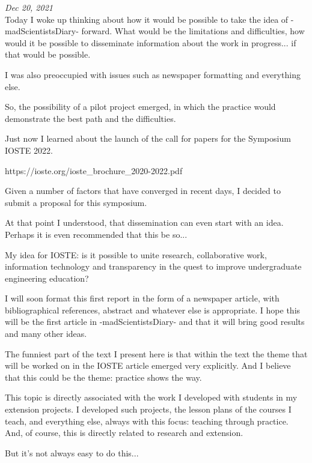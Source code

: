 \documentclass[11pt,letterpaper,twocolumn]{article}
\begin{document}
\emph{Dec 20, 2021} \\

Today I woke up thinking about how it would be possible to take the idea of -madScientistsDiary- forward. What would be the limitations and difficulties, how would it be possible to disseminate information about the work in progress... if that would be possible.

I was also preoccupied with issues such as newspaper formatting and everything else.

So, the possibility of a pilot project emerged, in which the practice would demonstrate the best path and the difficulties.

Just now I learned about the launch of the call for papers for the Symposium IOSTE 2022.

https://ioste.org/ioste\_brochure\_2020-2022.pdf

Given a number of factors that have converged in recent days, I decided to submit a proposal for this symposium.

At that point I understood, that dissemination can even start with an idea. Perhaps it is even recommended that this be so...

My idea for IOSTE: is it possible to unite research, collaborative work, information technology and transparency in the quest to improve undergraduate engineering education?

I will soon format this first report in the form of a newspaper article, with bibliographical references, abstract and whatever else is appropriate. I hope this will be the first article in -madScientistsDiary- and that it will bring good results and many other ideas.

The funniest part of the text I present here is that within the text the theme that will be worked on in the IOSTE article emerged very explicitly. And I believe that this could be the theme: practice shows the way.

This topic is directly associated with the work I developed with students in my extension projects. I developed such projects, the lesson plans of the courses I teach, and everything else, always with this focus: teaching through practice. And, of course, this is directly related to research and extension. 

But it's not always easy to do this...
\end{document}
